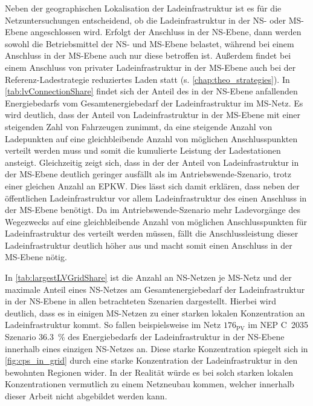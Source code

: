 Neben der geographischen Lokalisation der Ladeinfrastruktur ist es für die Netzuntersuchungen entscheidend, ob die Ladeinfrastruktur in der \gls{NS}- oder \gls{MS}-Ebene angeschlossen wird.
Erfolgt der Anschluss in der \gls{NS}-Ebene, dann werden sowohl die Betriebsmittel der \gls{NS}- und \gls{MS}-Ebene belastet, während bei einem Anschluss in der \gls{MS}-Ebene auch nur diese betroffen ist.
Außerdem findet bei einem Anschluss von privater Ladeinfrastruktur in der \gls{MS}-Ebene auch bei der Referenz-Ladestrategie reduziertes Laden statt (s. \autoref{chap:theo_strategies}).
In \autoref{tab:lvConnectionShare} findet sich der Anteil des in der \gls{NS}-Ebene anfallenden Energiebedarfs vom Gesamtenergiebedarf der Ladeinfrastruktur im \gls{MS}-Netz.
Es wird deutlich, dass der Anteil von Ladeinfrastruktur in der \gls{MS}-Ebene mit einer steigenden Zahl von Fahrzeugen zunimmt, da eine steigende Anzahl von Ladepunkten auf eine gleichbleibende Anzahl von möglichen Anschlusspunkten verteilt werden muss und somit die kumulierte Leistung der Ladestationen ansteigt.
Gleichzeitig zeigt sich, dass in der \SzeFirmenparkplatz der Anteil von Ladeinfrastruktur in der \gls{MS}-Ebene deutlich geringer ausfällt als im Antriebswende-Szenario, trotz einer gleichen Anzahl an \gls{EPKW}.
Dies lässt sich damit erklären, dass neben der öffentlichen Ladeinfrastruktur vor allem Ladeinfrastruktur des \UC \Firmeparkplatz einen Anschluss in der \gls{MS}-Ebene benötigt.
Da im Antriebswende-Szenario mehr Ladevorgänge des Wegezwecks \Arbeit auf eine gleichbleibende Anzahl von möglichen Anschlusspunkten für Ladeinfrastruktur des \UC \Firmeparkplatz verteilt werden müssen, fällt die Anschlussleistung dieser Ladeinfrastruktur deutlich höher aus und macht somit einen Anschluss in der \gls{MS}-Ebene nötig.



In \autoref{tab:largestLVGridShare} ist die Anzahl an \gls{NS}-Netzen je \gls{MS}-Netz und der maximale Anteil eines \gls{NS}-Netzes am Gesamtenergiebedarf der Ladeinfrastruktur in der \gls{NS}-Ebene in allen betrachteten Szenarien dargestellt.
Hierbei wird deutlich, dass es in einigen \gls{MS}-Netzen zu einer starken lokalen Konzentration an Ladeinfrastruktur kommt.
So fallen beispielsweise im Netz \(176_{\text{PV}}\) im NEP C~\num{2035} Szenario \SI{36.3}{\percent} des Energiebedarfs der Ladeinfrastruktur in der \gls{NS}-Ebene innerhalb eines einzigen \gls{NS}-Netzes an.
Diese starke Konzentration spiegelt sich in \autoref{fig:cps_in_grid} durch eine starke Konzentration der Ladeinfrastruktur in den bewohnten Regionen wider.
In der Realität würde es bei solch starken lokalen Konzentrationen vermutlich zu einem Netzneubau kommen, welcher innerhalb dieser Arbeit nicht abgebildet werden kann.

